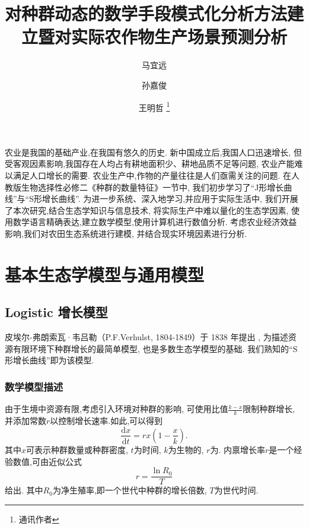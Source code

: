 \documentclass[a4paper, twocolumn]{ctexart}
\title{对种群动态的数学手段模式化分析方法建立暨对实际农作物生产场景预测分析}
\author{马宜远}
\author{孙嘉俊}
\author{王明哲 \thanks{通讯作者}}
\affil{大连市第二十四中学}
\date{}
\begin{document}
\saythanks

农业是我国的基础产业,在我国有悠久的历史.
新中国成立后,我国人口迅速增长,
但受客观因素影响,我国存在人均占有耕地面积少、耕地品质不足等问题,
农业产能难以满足人口增长的需要.
农业生产中,作物的产量往往是人们亟需关注的问题.
在人教版生物选择性必修二《种群的数量特征》一节中,
我们初步学习了“J形增长曲线”与“S形增长曲线”.
为进一步系统、深入地学习,并应用于实际生活中,
我们开展了本次研究,结合生态学知识与信息技术,
将实际生产中难以量化的生态学因素,
使用数学语言精确表达,建立数学模型,使用计算机进行数值分析.
考虑农业经济效益影响,我们对农田生态系统进行建模,
并结合现实环境因素进行分析.

\section{基本生态学模型与通用模型}

\subsection{Logistic 增长模型}
皮埃尔-弗朗索瓦·韦吕勒（P.F.Verhulst, 1804-1849）于 1838 年提出
\autocite{verhulst-population},
为描述资源有限环境下种群增长的最简单模型,
也是多数生态学模型的基础.
我们熟知的“S形增长曲线”即为该模型.

\subsubsection{数学模型描述}
由于生境中资源有限,考虑引入环境对种群的影响,
可使用比值$\frac{k - x}{k}$限制种群增长,
并添加常数$r$以控制增长速率.如此,可以得到
\begin{equation} \label{eq:logistic}
    \boxed{\frac{\mathrm{d} x}{\mathrm{d} t} = r x (1 - \frac{x}{k}).}
\end{equation}
其中$x$可表示种群数量或种群密度,
$t$为时间,
$k$为生物的,
$r$为\autocite{lotka-biologiques}.
内禀增长率$r$是一个经验数值,可由近似公式
\begin{equation*}
    r = \frac{\ln R_0}{T}
\end{equation*}
给出.
其中$R_0$为净生殖率,即一个世代中种群的增长倍数,
$T$为世代时间.
\end{document}
